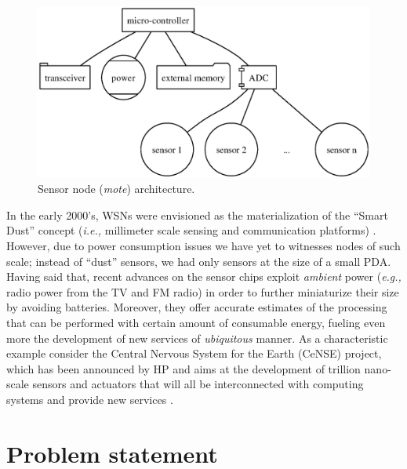 \documentclass[11pt]{article}
\begin{document}
\begin{figure}[htp]
\centering
	\includegraphics[scale=0.7]{fig/mote_arch.eps}
	\caption{Sensor node (\textit{mote}) architecture.}
	\label{fig:mote_arch}
\end{figure}

In the early 2000's, WSNs were envisioned as the materialization of the
``Smart Dust'' concept (\textit{i.e.,} millimeter scale sensing and
communication platforms) \cite{smartdust}. However, due to power
consumption issues we have yet to witnesses nodes of such scale; instead
of ``dust'' sensors, we had only sensors at the size of a small PDA.
Having said that, recent advances on the sensor chips exploit
\textit{ambient} power (\textit{e.g.,} radio power from the TV and FM
radio) in order to further miniaturize their size by avoiding batteries.
Moreover, they offer accurate estimates of the processing that can be
performed with certain amount of consumable energy, fueling even more the 
development of new services of \textit{ubiquitous} manner. As a
characteristic example consider the Central Nervous System for the Earth 
(CeNSE) project, which has been announced by HP and aims at the
development of trillion nano-scale sensors and actuators that will all be
interconnected with computing systems and provide new services
\cite{cense}.


\section{Problem statement}
\end{document}
